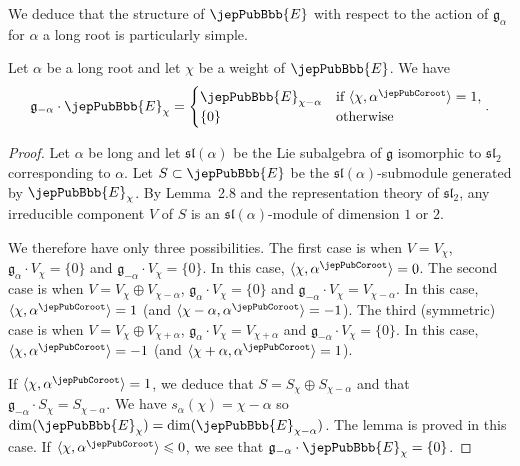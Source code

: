 We deduce that the structure of $\jepPubBbb{E}$ with respect to the action of $\mathfrak g_\alpha$ for $\alpha$ a long root is particularly simple.
\begin{lemma}
Let $\alpha$ be a long root and let $\chi$ be a weight of $\jepPubBbb{E}$. We have
\[
\mathfrak g_{-\alpha}\cdot \jepPubBbb{E}_\chi=\begin{cases}\jepPubBbb{E}_{\chi-\alpha}&\text{if }\langle\chi,\alpha^\jepPubCoroot\rangle=1,\\\{0\}&\text{otherwise}\end{cases}.
\]
\end{lemma}
\begin{proof}
Let $\alpha$ be long and let $\mathfrak{sl}(\alpha)$ be the Lie subalgebra of $\mathfrak g$ isomorphic to $\mathfrak{sl}_2$ corresponding to $\alpha$. Let $S\subset \jepPubBbb{E}$ be the $\mathfrak{sl}(\alpha)$-submodule generated by $\jepPubBbb{E}_\chi$. By Lemma~2.8 and the representation theory of $\mathfrak{sl}_2$, any irreducible component $V$ of $S$ is an $\mathfrak{sl}(\alpha)$-module of dimension $1$ or $2$.

We therefore have only three possibilities. The first case is when $V=V_\chi$, $\mathfrak g_\alpha\cdot V_\chi=\{0\}$ and $\mathfrak g_{-\alpha}\cdot V_\chi=\{0\}$. In this case, $\langle\chi,\alpha^\jepPubCoroot\rangle=0$. The second case is when $V=V_\chi\oplus V_{\chi-\alpha}$, $\mathfrak g_\alpha\cdot V_\chi=\{0\}$ and $\mathfrak g_{-\alpha}\cdot V_\chi=V_{\chi-\alpha}$. In this case, $\langle\chi,\alpha^\jepPubCoroot\rangle=1$ (and $\langle\chi-\alpha,\alpha^\jepPubCoroot\rangle=-1$). The third (symmetric) case is when $V=V_\chi\oplus V_{\chi+\alpha}$, $\mathfrak g_\alpha\cdot V_\chi=V_{\chi+\alpha}$ and $\mathfrak g_{-\alpha}\cdot V_\chi=\{0\}$. In this case, $\langle\chi,\alpha^\jepPubCoroot\rangle=-1$ (and $\langle\chi+\alpha,\alpha^\jepPubCoroot\rangle=1$).

If $\langle\chi,\alpha^\jepPubCoroot\rangle=1$, we deduce that $S=S_\chi\oplus S_{\chi-\alpha}$ and that $\mathfrak g_{-\alpha}\cdot S_\chi=S_{\chi-\alpha}$. We have $s_\alpha(\chi)=\chi-\alpha$ so $\dim(\jepPubBbb{E}_\chi)=\dim(\jepPubBbb{E}_{\chi-\alpha})$. The lemma is proved in this case. If $\langle\chi,\alpha^\jepPubCoroot\rangle\leqslant0$, we see that $\mathfrak g_{-\alpha}\cdot \jepPubBbb{E}_\chi=\{0\}$.
\end{proof}


